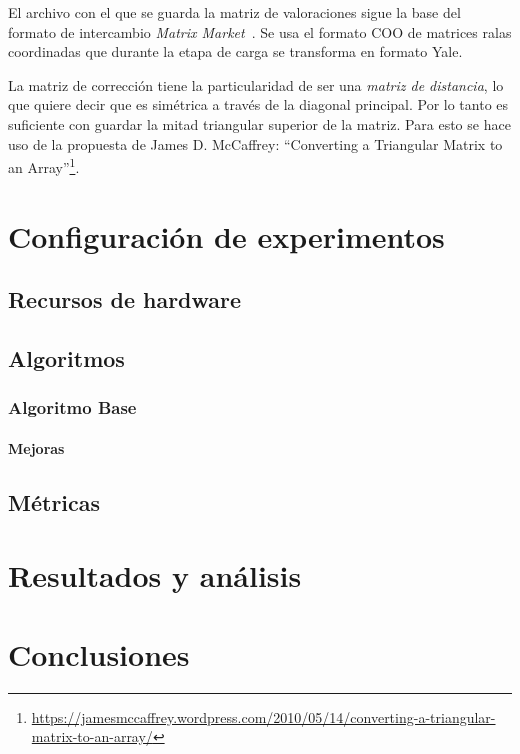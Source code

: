 \documentclass[11pt, a4paper]{article}
\begin{document}
  El archivo con el que se guarda la matriz de valoraciones sigue la base del
  formato de intercambio {\em Matrix Market}~\cite{Boisvert:aa}. Se usa el
  formato COO de matrices ralas coordinadas que durante la etapa de carga se
  transforma en formato Yale. 

  La matriz de corrección tiene la particularidad de ser una {\em matriz de
  distancia}, lo que quiere decir que es simétrica a través de la diagonal
  principal. Por lo tanto es suficiente con guardar la mitad triangular
  superior de la matriz. Para esto se hace uso de la propuesta de James D.
  McCaffrey: ``Converting a Triangular Matrix to an
  Array''\footnote{\url{https://jamesmccaffrey.wordpress.com/2010/05/14/converting-a-triangular-matrix-to-an-array/}}.

  \section{Configuración de experimentos}\label{sec:experimentos}

  \subsection{Recursos de hardware}

 
  \subsection{Algoritmos}

  \subsubsection{Algoritmo Base}

  \paragraph{Mejoras}

  \subsection{Métricas}

  \section{Resultados y análisis}\label{sec:resultados}


  \section{Conclusiones}\label{sec:conclusiones}

  \clearpage
  
  
\end{document}
